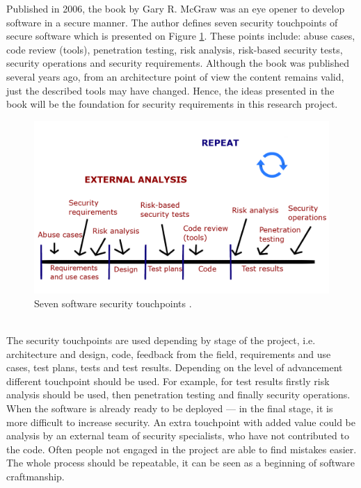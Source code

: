 \documentclass{article} %
\begin{document}
Published in 2006, the book by Gary R. McGraw \cite{bib:building_security_in} was an eye opener to develop software in a secure manner. The author defines seven security touchpoints of secure software which is presented on Figure \ref{fig:security_touchpoints}. These points include: abuse cases, code review (tools), penetration testing, risk analysis, risk-based security tests, security operations and security requirements. Although the book was published several years ago, from an architecture point of view the content remains valid, just the described tools may have changed. Hence, the ideas presented in the book will be the foundation for security requirements in this research project.
\begin{figure}[ht]
  \centering
      \includegraphics[width=1\textwidth]{touchpoints.png}
  \caption{Seven software security touchpoints \cite{bib:building_security_in}.}
  \label{fig:security_touchpoints}
\end{figure}\\
\newline
The security touchpoints are used depending by stage of the project, i.e. architecture and design, code, feedback from the field, requirements and use cases, test plans, tests and test results. Depending on the level of advancement different touchpoint should be used. For example, for test results firstly risk analysis should be used, then penetration testing and finally security operations. When the software is already ready to be deployed --- in the final stage, it is more difficult to increase security. An extra touchpoint with added value could be analysis by an external team of security specialists, who have not contributed to the code. Often people not engaged in the project are able to find mistakes easier. The whole process should be repeatable, it can be seen as a beginning of software craftmanship.
\end{document}
